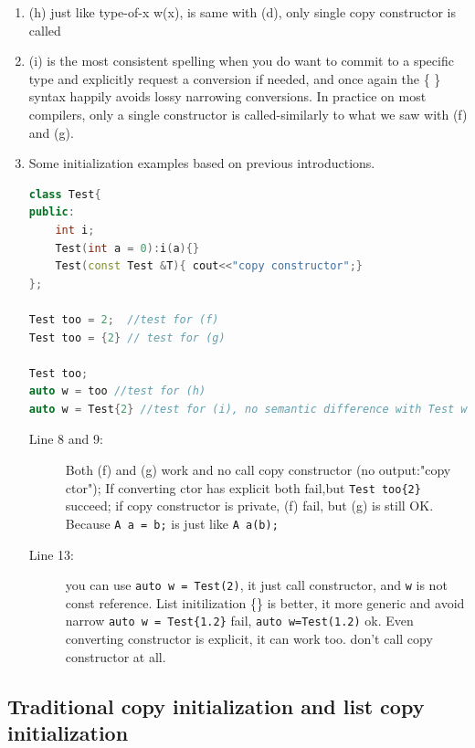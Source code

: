 \documentclass[a4paper,11pt,twoside]{book}
\begin{document}
\begin{itemize}
\begin{enumerate}
		\item (h) just like type-of-x w(x), is same with (d), only single copy constructor is called
		
		\item (i) is the most consistent spelling when you do want to commit to a specific type and explicitly request a conversion if needed, and once again the \{ \} syntax happily avoids lossy narrowing conversions. In practice on most compilers, only a single constructor is called-similarly to what we saw with (f) and (g).
		
		\item Some initialization examples based on previous introductions.
		
\begin{lstlisting}[frame=single, language=c++,mathescape=true]
class Test{
public:
	int i;
	Test(int a = 0):i(a){}
	Test(const Test &T){ cout<<"copy constructor";} 
};
		
Test too = 2;  //test for (f) 
Test too = {2} // test for (g)
		
Test too;  
auto w = too //test for (h)
auto w = Test{2} //test for (i), no semantic difference with Test w{2};
\end{lstlisting}
\begin{description}
	\item[Line 8 and 9:] Both (f) and (g) work and no call copy constructor (no output:"copy ctor"); If converting ctor has explicit both fail,but \texttt{Test too\{2\}} succeed; if copy constructor is private, (f) fail, but (g) is still OK. Because \texttt{A a = {b};} is just like \texttt{A a(b);}

	
	\item[Line 13:] you can use \texttt{auto w = Test(2)}, it just call constructor, and \texttt{w} is not const reference. List initilization \{\} is better, it more generic and avoid narrow \texttt{auto w = Test\{1.2\}} fail, \texttt{auto w=Test(1.2)} ok. Even converting constructor is explicit, it can work too. don't call copy constructor at all.
\end{description}

	\end{enumerate}

\end{itemize}

\subsection{Traditional copy initialization and list copy initialization}
\end{document}
